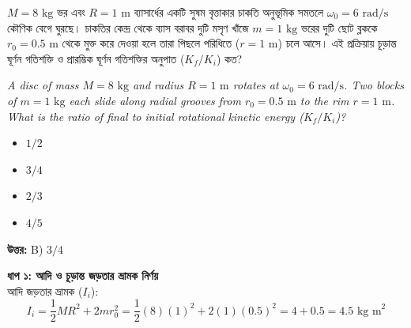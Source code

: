 \documentclass[12pt, a4paper]{article}
\begin{document}
{{\newpage

\begin{tcolorbox}[questionbox={প্রশ্ন (Question) 19}]
\noindent
$M = 8\text{ kg}$ ভর এবং $R = 1\text{ m}$ ব্যাসার্ধের একটি সুষম বৃত্তাকার চাকতি অনুভূমিক সমতলে $\omega_0 = 6\text{ rad/s}$ কৌণিক বেগে ঘুরছে। চাকতির কেন্দ্র থেকে ব্যাস বরাবর দুটি মসৃণ খাঁজে $m = 1\text{ kg}$ ভরের দুটি ছোট ব্লককে $r_0 = 0.5\text{ m}$ থেকে মুক্ত করে দেওয়া হলে তারা পিছলে পরিধিতে ($r = 1\text{ m}$) চলে আসে। এই প্রক্রিয়ায় চূড়ান্ত ঘূর্ণন গতিশক্তি ও প্রারম্ভিক ঘূর্ণন গতিশক্তির অনুপাত ($K_f / K_i$) কত?
\vspace{0.8em}
\begin{english}
\noindent\textit{\color{darkgray}
A disc of mass $M = 8\text{ kg}$ and radius $R = 1\text{ m}$ rotates at $\omega_0 = 6\text{ rad/s}$. Two blocks of $m = 1\text{ kg}$ each slide along radial grooves from $r_0 = 0.5\text{ m}$ to the rim $r = 1\text{ m}$. What is the ratio of final to initial rotational kinetic energy ($K_f / K_i$)?
}
\end{english}
\end{tcolorbox}

\begin{itemize}[label={}, leftmargin=1cm, itemsep=0.5em]
\item[\textbf{A)}] $1/2$
\item[\textbf{B)}] $3/4$
\item[\textbf{C)}] $2/3$
\item[\textbf{D)}] $4/5$
\end{itemize}
\vspace{0.5em}

\begin{tcolorbox}[answerbox]
\textbf{\color{success} উত্তর:} B) $3/4$
\end{tcolorbox}
\vspace{1em}

\begin{tcolorbox}[solutionbox={সমাধান (Solution)}]
\noindent
\textbf{ধাপ ১: আদি ও চূড়ান্ত জড়তার ভ্রামক নির্ণয়} \\
আদি জড়তার ভ্রামক ($I_i$):
\[I_i = \frac{1}{2} M R^2 + 2 m r_0^2 = \frac{1}{2}(8)(1)^2 + 2(1)(0.5)^2 = 4 + 0.5 = 4.5\text{ kg m}^2\]


\end{tcolorbox}}}
\end{document}
